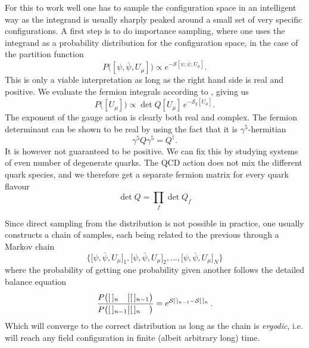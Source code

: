 For this to work well one has to sample the configuration space in an
intelligent way as the integrand is usually sharply peaked around a small set of
very specific configurations. A first step is to do importance sampling, where
one uses the integrand as a probability distribution for the configuration
space, in the case of the partition function
%
\begin{equation}
  P\big([\psi,\bar{\psi}, U_{\mu}]\big) \propto e^{-\mathcal{S}[\psi,\bar{\psi}, U_{\mu}]}.
\end{equation}
%
This is only a viable interpretation as long as the right hand side is real and
positive. We evaluate the fermion integrals according to
, giving us
%
\begin{equation}
  P\big([U_{\mu}]\big) \propto \det Q[U_{\mu}] \, e^{-\mathcal{S}_g[U_{\mu}]}.
\end{equation}
%
The exponent of the gauge action is clearly both real and complex. The fermion
determinant can be shown to be real by using the fact that it is
$\gamma^5$-hermitian
%
\begin{equation}
  \gamma^5 Q \gamma^5 = Q^{\dagger}.
\end{equation}
%
It is however not guaranteed to be positive. We can fix this by studying systems
of even number of degenerate quarks. The QCD action does not mix the different
quark species, and we therefore get a separate fermion matrix for every quark
flavour
%
\begin{equation}
  \det Q = \prod_f \det Q_f
\end{equation}

Since direct sampling from the distribution is not possible in practice,
one usually constructs a chain of samples, each being related to the previous
through a Markov chain
%
\begin{equation}
  \Big\{
    \big[\psi, \bar{\psi}, U_{\mu}\big]_1, 
    \big[\psi, \bar{\psi}, U_{\mu}\big]_2, ..., 
    \big[\psi, \bar{\psi}, U_{\mu}\big]_N
  \Big\}
\end{equation}
%
where the probability of getting one probability given another follows the
detailed balance equation
%
\begin{equation}
  \frac{%
    P\big([\,]_{n\hphantom{-1}} \big| [\,]_{n-1}\big)
  }{%
    P\big([\,]_{n-1} \big| [\,]_{n\hphantom{-1}}\big)
  } = e^{\mathcal{S}[\,]_{n-1} - \mathcal{S}[\,]_n} \,.
\end{equation}
%
Which will converge to the correct distribution as long as the chain is
\emph{ergodic}, i.e. will reach any field configuration in finite (albeit
arbitrary long) time.

